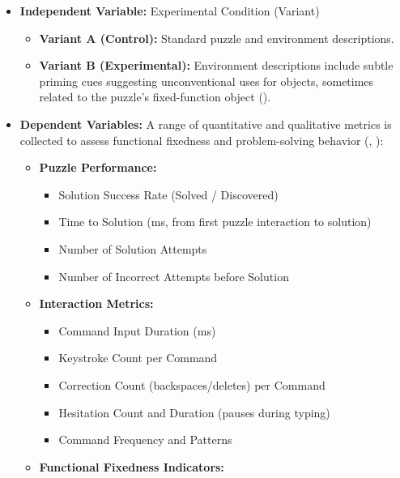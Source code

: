 \documentclass{article}
\begin{document}
\begin{itemize}
    \item \textbf{Independent Variable:} Experimental Condition (Variant)
        \begin{itemize}
            \item \textbf{Variant A (Control):} Standard puzzle and environment descriptions.
            \item \textbf{Variant B (Experimental):} Environment descriptions include subtle priming cues suggesting unconventional uses for objects, sometimes related to the puzzle's fixed-function object ().
        \end{itemize}
    \item \textbf{Dependent Variables:} A range of quantitative and qualitative metrics is collected to assess functional fixedness and problem-solving behavior (, ):
        \begin{itemize}
            \item \textbf{Puzzle Performance:}
                \begin{itemize}
                    \item Solution Success Rate (Solved / Discovered)
                    \item Time to Solution (ms, from first puzzle interaction to solution)
                    \item Number of Solution Attempts
                    \item Number of Incorrect Attempts before Solution
                \end{itemize}
            \item \textbf{Interaction Metrics:}
                \begin{itemize}
                    \item Command Input Duration (ms)
                    \item Keystroke Count per Command
                    \item Correction Count (backspaces/deletes) per Command
                    \item Hesitation Count and Duration (pauses during typing)
                    \item Command Frequency and Patterns
                \end{itemize}
            \item \textbf{Functional Fixedness Indicators:}
                \begin{itemize}

\end{itemize}
\end{itemize}
\end{itemize}
\end{document}
